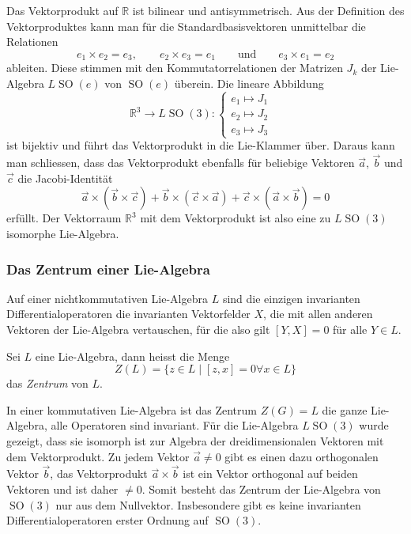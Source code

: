 \begin{beispiel}
Das Vektorprodukt auf $\mathbb{R}$ ist bilinear und antisymmetrisch.
Aus der Definition des Vektorproduktes kann man für die Standardbasisvektoren
unmittelbar die Relationen
\[
e_1\times e_2
=
e_3,
\qquad
e_2\times e_3
=
e_1
\qquad\text{und}\qquad
e_3\times e_1
=
e_2
\]
ableiten.
Diese stimmen mit den Kommutatorrelationen der Matrizen $J_k$ der
Lie-Algebra $L\operatorname{SO}(e)$ von $\operatorname{SO}(e)$ überein.
Die lineare Abbildung
\[
\mathbb{R}^3 \to L\operatorname{SO}(3):
\begin{cases}
e_1 \mapsto J_1&\\
e_2 \mapsto J_2&\\
e_3 \mapsto J_3&
\end{cases}
\]
ist bijektiv und
führt das Vektorprodukt in die Lie-Klammer über.
Daraus kann man schliessen, dass das Vektorprodukt ebenfalls für beliebige
Vektoren $\vec{a}$, $\vec{b}$ und $\vec{c}$ die Jacobi-Identität
\[
\vec{a}\times (\vec{b}\times\vec{c})
+
\vec{b}\times (\vec{c}\times\vec{a})
+
\vec{c}\times (\vec{a}\times\vec{b})
=
0
\]
erfüllt.
Der Vektorraum $\mathbb{R}^3$ mit dem Vektorprodukt ist also eine
zu $L\operatorname{SO}(3)$ isomorphe Lie-Algebra.
\end{beispiel}

%
%
\subsubsection{Das Zentrum einer Lie-Algebra}
Auf einer nichtkommutativen Lie-Algebra $L$ sind die einzigen invarianten
Differentialoperatoren die invarianten Vektorfelder $X$, die mit allen
anderen Vektoren der Lie-Algebra vertauschen, für die also gilt
$[Y,X]=0$ für alle $Y\in L$.

\begin{definition}
Sei $L$ eine Lie-Algebra, dann heisst die Menge
\[
Z(L)
=
\{z\in L\mid [z,x]=0\forall x\in L\}
\]
das {\em Zentrum} von $L$.
\end{definition}

In einer kommutativen Lie-Algebra ist das Zentrum $Z(G)=L$ die ganze
Lie-Algebra, alle Operatoren sind invariant.
Für die Lie-Algebra $L\operatorname{SO}(3)$ wurde gezeigt, dass sie
isomorph ist zur Algebra der dreidimensionalen Vektoren mit dem
Vektorprodukt.
Zu jedem Vektor $\vec{a}\ne 0$ gibt es einen dazu orthogonalen Vektor
$\vec{b}$, das Vektorprodukt $\vec{a}\times\vec{b}$ ist ein Vektor
orthogonal auf beiden Vektoren und ist daher $\ne 0$.
Somit besteht das Zentrum der Lie-Algebra von $\operatorname{SO}(3)$ nur
aus dem Nullvektor.
Insbesondere gibt es keine invarianten Differentialoperatoren erster
Ordnung auf $\operatorname{SO}(3)$.

